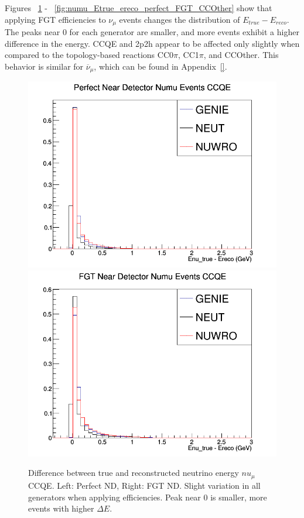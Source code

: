 \documentclass[12pt]{article}
\begin{document}
\FloatBarrier

Figures ~\ref{fig:numu_Etrue_ereco_perfect_FGT_CCQE} - ~\ref{fig:numu_Etrue_ereco_perfect_FGT_CCOther} show that applying FGT efficiencies to $\nu_\mu$ events changes the distribution of $E_{true} - E_{reco}$. The peaks near 0 for each generator are smaller, and more events exhibit a higher difference in the energy. CCQE and 2p2h appear to be affected only slightly when compared to the topology-based reactions CC0$\pi$, CC1$\pi$, and CCOther. This behavior is similar for $\overline{\nu}_\mu$, which can be found in Appendix~\ref{}.


\begin{figure}[h]
\centering
{}
\includegraphics[width=\linewidth]{Ereco_Etrue/numu_perfect_ND_CCQE.png}
\endminipage
{}
\includegraphics[width=\linewidth]{Ereco_Etrue/numu_FGT_CCQE.png}
\endminipage
\caption{Difference between true and reconstructed neutrino energy $nu_\mu$ CCQE. Left: Perfect ND, Right: FGT ND. Slight variation in all generators when applying efficiencies. Peak near 0 is smaller, more events with higher $\Delta E$.}
\label{fig:numu_Etrue_ereco_perfect_FGT_CCQE}
\end{figure}
\end{document}
